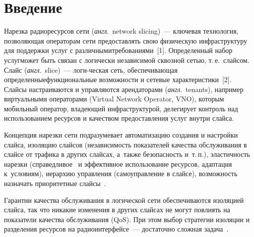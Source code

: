   
\vspace*{-3pt}



\thispagestyle{headings}

\begin{multicols}{2}

\label{st\stat}

\section{Введение}

  Нарезка радиоресурсов сети (\textit{англ}.\ network slicing)~--- ключевая 
технология, позволяющая операторам сети предоставлять свою физическую 
инфраструктуру для поддержки услуг с различными\linebreak требованиями~[1]. 
Определенный набор услуг\linebreak может быть связан с логически независимой 
сквоз\-ной сетью, т.\,е.\ слайсом. Слайс (\textit{англ}.\ slice)~--- логи-\linebreak ческая 
сеть, обеспечивающая определенные\linebreak функциональные возможности и 
сетевые харак\-те\-ри\-сти\-ки~[2]. Слайсы настраиваются и управ\-ля\-ют\-ся 
арендаторами (\textit{англ}.\ tenants), например виртуальными операторами 
(Virtual Network Operator, VNO), которым мобильный оператор, владеющий 
инфраструктурой, делегирует контроль над использованием ресурсов и 
качеством предоставления услуг внутри слайса. 

Концепция нарезки сети 
подразумевает автоматизацию создания и настройки слайса, изоляцию 
слайсов (независимость показателей качества обслуживания в слайсе от 
трафика в других слайсах, а~также безопас\-ность и~т.\,п.), эластичность 
нарезки (справедливое~\cite{4-mos} и эффективное использование ресурсов, 
адаптация к~условиям), иерархию управ\-ления (самоуправление в слайсе), 
возможность назначать приоритетные слайсы~\cite{3-mos}.
  
  Гарантии качества обслуживания в логической сети обеспечиваются 
изоляцией слайса, так что никакие изменения в других слайсах не могут 
повлиять на показатели качества обслуживания (QoS). При 
этом выбор стратегии изоляции и разделения ресурсов на 
радиоинтерфейсе~--- достаточно сложная  
задача~\cite{5-mos}. 


\end{multicols}
